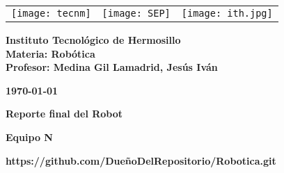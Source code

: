 \begin{titlepage}
	\centering
	\begin{tabular}{@{}p{} p{} p{}@{}}
		\texttt{[image: tecnm]} & 
		\centering \texttt{[image: SEP]} & 
		\raggedleft \texttt{[image: ith.jpg]} \\
	\end{tabular}
	
	\vspace{2em}
	
	\noindent
	\begin{minipage}[t]{0.6\textwidth}
		\raggedright
		\small \textbf{%
			Instituto Tecnológico de Hermosillo\\
			Materia: Robótica\\
			Profesor: Medina Gil Lamadrid, Jesús Iván%
		}
	\end{minipage}%
	\hfill
	\begin{minipage}[t]{0.3\textwidth}
		\raggedleft
		\small \textbf{\today}
	\end{minipage}
	
	\vspace{2em}
	
	{\Huge \textbf{Reporte final del Robot}}
		
	\vspace{1em}
	
	\begin{center}
		{\Large \textbf{Equipo N}}
		
		{\small \textbf{https://github.com/DueñoDelRepositorio/Robotica.git}}
	\end{center}
	
	\vspace{1em}
	

\end{titlepage}
